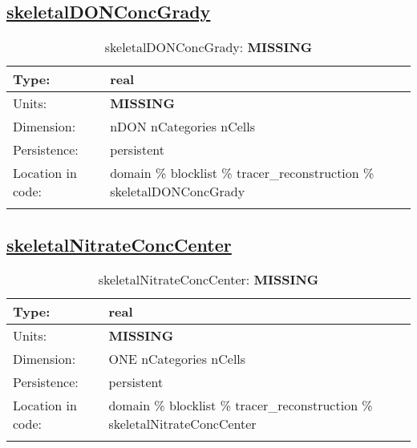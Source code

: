 \subsection[skeletalDONConcGrady]{\hyperref[sec:var_tab_tracer_reconstruction]{skeletalDONConcGrady}}
\label{subsec:var_sec_tracer_reconstruction_skeletalDONConcGrady}
\begin{center}
\begin{longtable}{| p{2.0in} | p{4.0in} |}
        \hline 
        Type: & real \\
        \hline 
        Units: & {\bf \color{red} MISSING} \\
        \hline 
        Dimension: & nDON nCategories nCells \\
        \hline 
        Persistence: & persistent \\
        \hline 
         Location in code: & domain \% blocklist \% tracer\_reconstruction \% skeletalDONConcGrady \\
         \hline 
    \caption{skeletalDONConcGrady: {\bf \color{red} MISSING}}
\end{longtable}
\end{center}
\subsection[skeletalNitrateConcCenter]{\hyperref[sec:var_tab_tracer_reconstruction]{skeletalNitrateConcCenter}}
\label{subsec:var_sec_tracer_reconstruction_skeletalNitrateConcCenter}
\begin{center}
\begin{longtable}{| p{2.0in} | p{4.0in} |}
        \hline 
        Type: & real \\
        \hline 
        Units: & {\bf \color{red} MISSING} \\
        \hline 
        Dimension: & ONE nCategories nCells \\
        \hline 
        Persistence: & persistent \\
        \hline 
         Location in code: & domain \% blocklist \% tracer\_reconstruction \% skeletalNitrateConcCenter \\
         \hline 
    \caption{skeletalNitrateConcCenter: {\bf \color{red} MISSING}}
\end{longtable}
\end{center}
